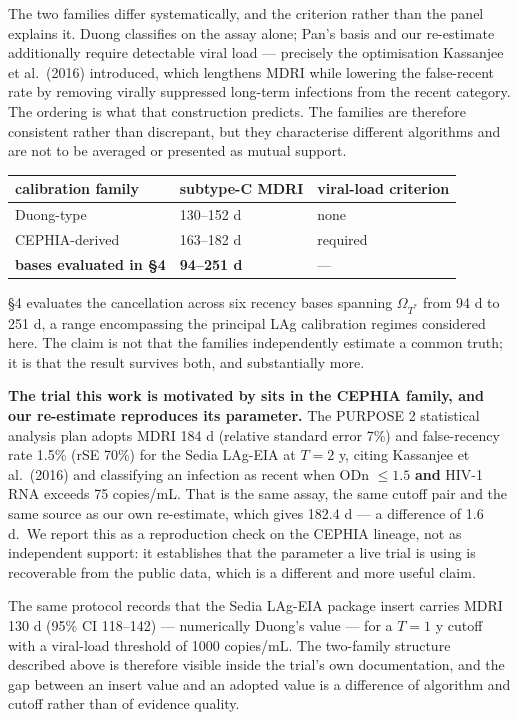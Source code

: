 The two families differ systematically, and the criterion rather than the panel explains it. Duong classifies on the assay alone; Pan's basis and our re-estimate additionally require detectable viral load --- precisely the optimisation Kassanjee et al.~(2016) introduced, which lengthens MDRI while lowering the false-recent rate by removing virally suppressed long-term infections from the recent category. The ordering is what that construction predicts. The families are therefore consistent rather than discrepant, but they characterise different algorithms and are not to be averaged or presented as mutual support.

{%
\begin{longtable}[]{@{}lll@{}}
\toprule\noalign{}
calibration family & subtype-C MDRI & viral-load criterion \\
\midrule\noalign{}
\endhead
\bottomrule\noalign{}
\endlastfoot
Duong-type & 130--152 d & none \\
CEPHIA-derived & 163--182 d & required \\
\textbf{bases evaluated in §4} & \textbf{94--251 d} & --- \\
\end{longtable}
}

§4 evaluates the cancellation across six recency bases spanning \(\Omega_{T^*}\) from 94 d to 251 d, a range encompassing the principal LAg calibration regimes considered here. The claim is not that the families independently estimate a common truth; it is that the result survives both, and substantially more.

\textbf{The trial this work is motivated by sits in the CEPHIA family, and our re-estimate reproduces its parameter.} The PURPOSE 2 statistical analysis plan adopts MDRI 184 d (relative standard error 7\%) and false-recency rate 1.5\% (rSE 70\%) for the Sedia LAg-EIA at \(T=2\) y, citing Kassanjee et al.~(2016) and classifying an infection as recent when ODn \(\le1.5\) \textbf{and} HIV-1 RNA exceeds 75 copies/mL. That is the same assay, the same cutoff pair and the same source as our own re-estimate, which gives 182.4 d --- a difference of 1.6 d.~We report this as a reproduction check on the CEPHIA lineage, not as independent support: it establishes that the parameter a live trial is using is recoverable from the public data, which is a different and more useful claim.

The same protocol records that the Sedia LAg-EIA package insert carries MDRI 130 d (95\% CI 118--142) --- numerically Duong's value --- for a \(T=1\) y cutoff with a viral-load threshold of 1000 copies/mL. The two-family structure described above is therefore visible inside the trial's own documentation, and the gap between an insert value and an adopted value is a difference of algorithm and cutoff rather than of evidence quality.

